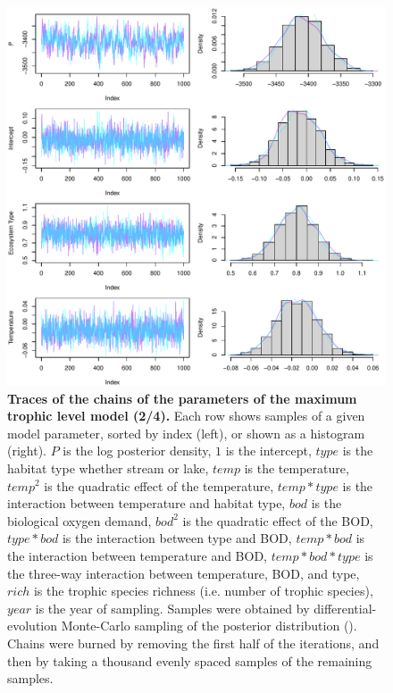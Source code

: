 \documentclass[11pt, oneside]{article}
\begin{document}
\begin{figure}[H]
\begin{center}
\includegraphics[page=2, width=1\linewidth]{scripts/b0_6_3/out_mTL/fig_tracePlot_beta.pdf}
\caption{
    \textbf{Traces of the chains of the parameters of the maximum trophic level model (2/4).}
    Each row shows samples of a given model parameter, sorted by index (left), or shown as a histogram (right).
    $P$ is the log posterior density, $1$ is the intercept, $type$ is the habitat type whether stream or lake, $temp$ is the temperature, $temp^2$ is the quadratic effect of the temperature, $temp * type$ is the interaction between temperature and habitat type, $bod$ is the biological oxygen demand, $bod^2$ is the quadratic effect of the BOD, $type * bod$ is the interaction between type and BOD, $temp * bod$ is the interaction between temperature and BOD, $temp * bod * type$ is the three-way interaction between temperature, BOD, and type, $rich$ is the trophic species richness (i.e. number of trophic species), $year$ is the year of sampling.
    Samples were obtained by differential-evolution Monte-Carlo sampling of the posterior distribution (\cite{TerBraak2006}).
    Chains were burned by removing the first half of the iterations, and then by taking a thousand evenly spaced samples of the remaining samples.
}
\end{center}
\end{figure}
\end{document}
